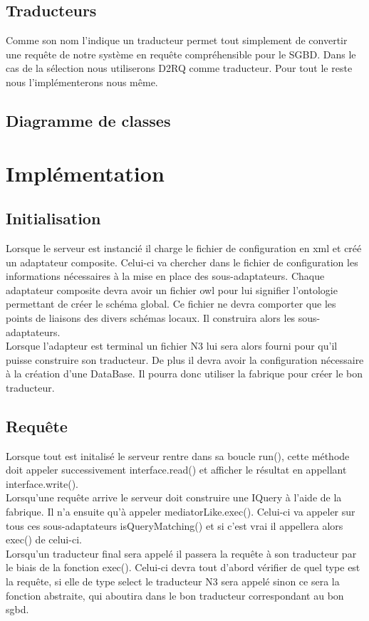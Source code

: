 \documentclass[12pt]{article}
\begin{document}
\subsection{Traducteurs}

	Comme son nom l'indique un traducteur permet tout simplement de convertir une requête de notre système en requête compréhensible pour le SGBD. Dans le cas de la sélection nous utiliserons D2RQ comme traducteur. Pour tout le reste nous l'implémenterons nous même.

\subsection{Diagramme de classes}

\section{Implémentation}

\subsection{Initialisation}

	Lorsque le serveur est instancié il charge le fichier de configuration en xml et créé un adaptateur composite. Celui-ci va chercher dans le fichier de configuration les informations nécessaires à la mise en place des sous-adaptateurs. Chaque adaptateur composite devra avoir un fichier owl pour lui signifier l'ontologie permettant de créer le schéma global. Ce fichier ne devra comporter que les points de liaisons des divers schémas locaux. Il construira alors les sous-adaptateurs. \\

\indent Lorsque l'adapteur est terminal un fichier N3 lui sera alors fourni pour qu'il puisse construire son traducteur. De plus il devra avoir la configuration nécessaire à la création d'une DataBase. Il pourra donc utiliser la fabrique pour créer le bon traducteur.

\subsection{Requête}

Lorsque tout est initalisé le serveur rentre dans sa boucle run(), cette méthode doit appeler successivement interface.read() et afficher le résultat en appellant interface.write(). \\

\indent Lorsqu'une requête arrive le serveur doit construire une IQuery à l'aide de la fabrique. Il n'a ensuite qu'à appeler mediatorLike.exec(). Celui-ci va appeler sur tous ces sous-adaptateurs isQueryMatching() et si c'est vrai il appellera alors exec() de celui-ci. \\
\indent Lorsqu'un traducteur final sera appelé il passera la requête à son traducteur par le biais de la fonction exec(). Celui-ci devra tout d'abord vérifier de quel type est la requête, si elle de type select le traducteur N3 sera appelé sinon ce sera la fonction abstraite, qui aboutira dans le bon traducteur correspondant au bon sgbd. \\
\end{document}
